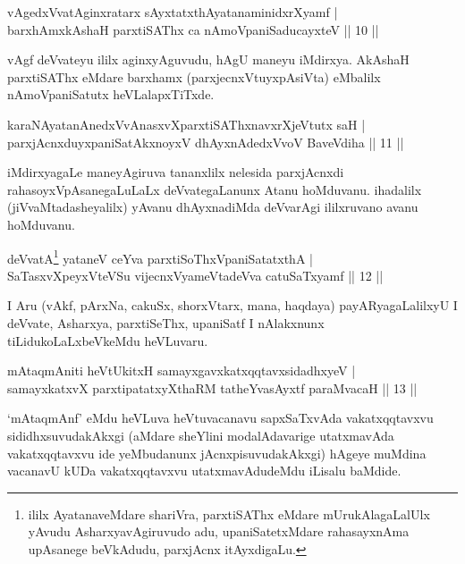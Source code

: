 
\begin{shl}
vAgedxVvatA\s ginxratarx sAyxtatxthA\s \s yatanaminidxrXyamf |\\
barxhAmx\s \s kAshaH parxtiSAThx ca nAmoVpaniSaducayxteV \hfill || 10 || 
\end{shl}

\begin{artha}
vAgf deVvateyu ililx aginxyAguvudu, hAgU maneyu iMdirxya.  AkAshaH parxtiSAThx eMdare barxhamx (parxjecnxVtuyxpAsiVta) eMbalilx nAmoVpaniSatutx heVLalapxTiTxde.
\end{artha}


\begin{shl}
karaNAyatanAnedxVvAnasxvXparxtiSAThxnavxrXjeVtutx saH |\\
parxjAcnxduyxpaniSatAkxnoyxV dhAyxnAdedxVvoV BaveVdiha \hfill || 11 || 
\end{shl}

\begin{artha}
iMdirxyagaLe maneyAgiruva tananxlilx nelesida parxjAcnxdi rahasoyxVpAsanegaLuLaLx deVvategaLanunx Atanu hoMduvanu. ihadalilx (jiVvaMtadasheyalilx) yAvanu dhAyxnadiMda deVvarAgi ililxruvano avanu hoMduvanu.
\end{artha}

\begin{shl}
deVvatA\s\footnote{ililx AyatanaveMdare shariVra, parxtiSAThx eMdare mUrukAlagaLalUlx yAvudu AsharxyavAgiruvudo adu, upaniSatetxMdare rahasayxnAma upAsanege beVkAdudu, parxjAcnx itAyxdigaLu. } yataneV ceYva parxtiSoThxVpaniSatatxthA |\\
SaTasxvXpeyxVteVSu vijecnxVyameVtadeVva catuSaTxyamf \hfill || 12 || 
\end{shl}

\begin{artha}
I Aru (vAkf, pArxNa, cakuSx, shorxVtarx, mana, haqdaya) payARyagaLalilxyU I deVvate, Asharxya, parxtiSeThx, upaniSatf I nAlakxnunx tiLidukoLaLxbeVkeMdu heVLuvaru.
\end{artha}

\begin{shl}
mAtaqmAniti heVtUkitxH samayxgavxkatxqqtavxsidadhxyeV |\\
samayxkatxvX parxtipatatxyXthaRM tatheYvasAyxtf paraMvacaH || 13 ||
\end{shl}

\begin{artha}
`mAtaqmAnf' eMdu heVLuva heVtuvacanavu sapxSaTxvAda vakatxqqtavxvu sididhxsuvudakAkxgi (aMdare sheYlini modalAdavarige utatxmavAda vakatxqqtavxvu ide yeMbudanunx jAcnxpisuvudakAkxgi) hAgeye muMdina vacanavU kUDa vakatxqqtavxvu utatxmavAdudeMdu iLisalu baMdide.
\end{artha}

